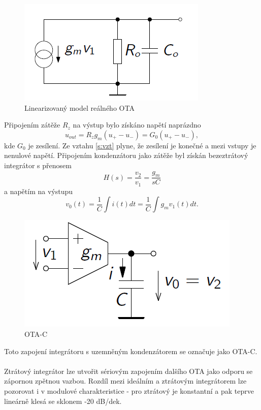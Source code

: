 \begin{figure}[h]
\centering
\includegraphics[scale=0.6]{gmrc.png}
\caption[Linearizovaný model reálného OTA]{Linearizovaný model reálného OTA \cite{5}}
\end{figure}
\noindent Připojením zátěže $R_z$ na výstup bylo získáno napětí naprázdno
\begin{equation}\label{s:vzt}
u_{out} = R_zg_m(u_+ - u_-) = G_0(u_+ - u_-),
\end{equation}
kde $G_0$ je zesílení. Ze vztahu \ref{s:vzt} plyne, že zesílení je konečné a mezi vstupy je nenulové napětí. Připojením kondenzátoru jako zátěže byl získán bezeztrátový integrátor s přenosem
\begin{equation}
H(s) = \frac{v_2}{v_1} = \frac{g_m}{sC}
\end{equation}
\noindent a napětím na výstupu
\begin{equation}
v_0(t) = \frac{1}{C}\int i(t)dt = \frac{1}{C}\int g_mv_1(t)dt.
\end{equation}
\begin{figure}[h]
\centering
\includegraphics[scale=0.5]{otaintegrator.png}
\caption[OTA-C]{OTA-C \cite{5}}
\end{figure}
\noindent Toto zapojení integrátoru s uzemněným kondenzátorem se označuje jako OTA-C.\\
\\
Ztrátový integrátor lze utvořit sériovým zapojením dalšího OTA jako odporu se zápornou zpětnou vazbou. Rozdíl mezi ideálním a ztrátovým integrátorem lze pozorovat i v modulové charakteristice - pro ztrátový je konstantní a pak teprve lineárně klesá se sklonem -20 dB/dek.
